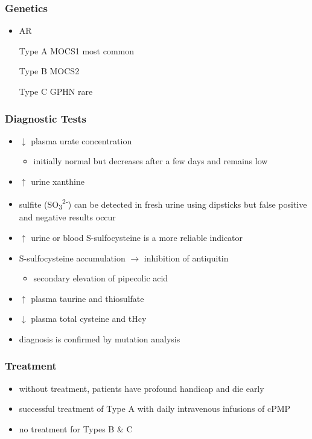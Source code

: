 \documentclass[12pt]{scrartcl}
\begin{document}
\begin{center}
\begin{center}
\subsubsection{Genetics}
\label{sec:org33a0e9c}
\begin{itemize}
\item AR
\item[{Type A}] MOCS1 most common
\item[{Type B}] MOCS2
\item[{Type C}] GPHN rare
\end{itemize}

\subsubsection{Diagnostic Tests}
\label{sec:org6c3c06d}
\begin{itemize}
\item \(\downarrow\) plasma urate concentration
\begin{itemize}
\item initially normal but decreases after a few days and remains low
\end{itemize}
\item \(\uparrow\) urine xanthine
\item sulfite (SO\textsubscript{3}\textsuperscript{2-}) can be detected in fresh urine using dipsticks but false
positive and negative results occur
\item \(\uparrow\) urine or blood S-sulfocysteine is a more reliable indicator
\end{itemize}


\begin{itemize}
\item S-sulfocysteine accumulation \(\to\) inhibition of antiquitin
\begin{itemize}
\item secondary elevation of pipecolic acid
\end{itemize}
\end{itemize}
\begin{itemize}
\item \(\uparrow\) plasma taurine and thiosulfate
\item \(\downarrow\) plasma total cysteine and tHcy
\item diagnosis is confirmed by mutation analysis
\end{itemize}

\subsubsection{Treatment}
\label{sec:org88a7ffc}
\begin{itemize}
\item without treatment, patients have profound handicap and die early
\item successful treatment of Type A with daily intravenous infusions of
cPMP
\item no treatment for Types B \& C
\end{itemize}


\end{center}
\end{center}
\end{document}
